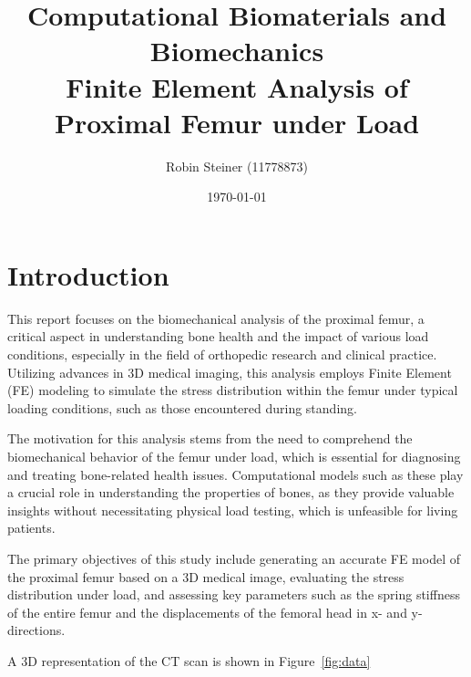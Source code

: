 \documentclass[a4paper,12pt]{article}
\begin{document}
    \title{Computational Biomaterials and Biomechanics\\[1ex]
    \Large Finite Element Analysis of Proximal Femur under Load}
    \author{Robin Steiner (11778873)}
    \date{\today}
    \maketitle

    \thispagestyle{empty}
    \newpage

    \tableofcontents

    \newpage


    \section{Introduction}\label{sec:introduction}
    This report focuses on the biomechanical analysis of the proximal femur, a critical aspect in understanding bone health and the impact of various load conditions, especially in the field of orthopedic research and clinical practice.
    Utilizing advances in 3D medical imaging, this analysis employs Finite Element (FE) modeling to simulate the stress distribution within the femur under typical loading conditions, such as those encountered during standing.

    \vspace{10pt}
    The motivation for this analysis stems from the need to comprehend the biomechanical behavior of the femur under load, which is essential for diagnosing and treating bone-related health issues.
    Computational models such as these play a crucial role in understanding the properties of bones, as they provide valuable insights without necessitating physical load testing, which is unfeasible for living patients.

    \vspace{10pt}
    The primary objectives of this study include generating an accurate FE model of the proximal femur based on a 3D medical image, evaluating the stress distribution under load, and assessing key parameters such as the spring stiffness of the entire femur and the displacements of the femoral head in x- and y-directions.

    \vspace{10pt}
    A 3D representation of the CT scan is shown in Figure~\ref{fig:data}
\end{document}

